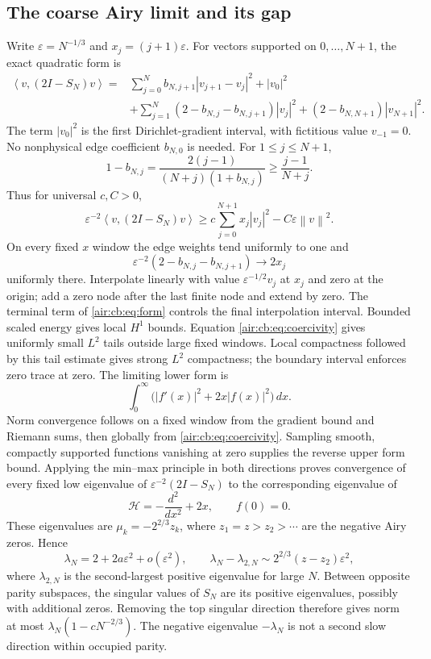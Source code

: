 \documentclass[11pt,letterpaper]{article}
\numberwithin{equation}{section}
\theoremstyle{remark}
\newcommand{\norm}[1]{\left\lVert#1\right\rVert}
\newcommand{\ip}[2]{\left\langle#1,#2\right\rangle}
\newcommand{\eps}{\varepsilon}
\begin{document}
\subsection{The coarse Airy limit and its gap}
Write $\eps=N^{-1/3}$ and $x_j=(j+1)\eps$. For vectors supported on
$0,\ldots,N+1$, the exact quadratic form is
\begin{equation}\label{air:cb:eq:form}
\begin{aligned}
\ip{v}{(2I-S_N)v}={}&\sum_{j=0}^{N}b_{N,j+1}|v_{j+1}-v_j|^2+|v_0|^2\\
&+\sum_{j=1}^{N}(2-b_{N,j}-b_{N,j+1})|v_j|^2
+(2-b_{N,N+1})|v_{N+1}|^2.
\end{aligned}
\end{equation}
The term $|v_0|^2$ is the first Dirichlet-gradient interval, with fictitious
value $v_{-1}=0$. No nonphysical edge coefficient $b_{N,0}$ is needed.
For $1\le j\le N+1$,
\[
1-b_{N,j}=\frac{2(j-1)}{(N+j)(1+b_{N,j})}\ge\frac{j-1}{N+j}.
\]
Thus for universal $c,C>0$,
\begin{equation}\label{air:cb:eq:coercivity}
\eps^{-2}\ip{v}{(2I-S_N)v}
\ge c\sum_{j=0}^{N+1}x_j|v_j|^2-C\eps\norm v^2.
\end{equation}
On every fixed $x$ window the edge weights tend uniformly to one and
\[
\eps^{-2}(2-b_{N,j}-b_{N,j+1})\longrightarrow2x_j
\]
uniformly there. Interpolate linearly with value $\eps^{-1/2}v_j$ at $x_j$
and zero at the origin; add a zero node after the last finite node and
extend by zero. The terminal term of \eqref{air:cb:eq:form} controls the final
interpolation interval. Bounded scaled energy gives local $H^1$ bounds.
Equation \eqref{air:cb:eq:coercivity} gives uniformly small $L^2$ tails outside
large fixed windows. Local compactness followed by this tail estimate gives
strong $L^2$ compactness; the boundary interval enforces zero trace at zero.
The limiting lower form is
\[
\int_0^\infty\bigl(|f'(x)|^2+2x|f(x)|^2\bigr)\,dx.
\]
Norm convergence follows on a fixed window from the gradient bound and
Riemann sums, then globally from \eqref{air:cb:eq:coercivity}. Sampling smooth,
compactly supported functions vanishing at zero supplies the reverse upper
form bound. Applying the min--max principle in both directions proves
convergence of every fixed low eigenvalue of $\eps^{-2}(2I-S_N)$ to the
corresponding eigenvalue of
\[
\mathcal H=-\frac{d^2}{dx^2}+2x,\qquad f(0)=0.
\]
These eigenvalues are $\mu_k=-2^{2/3}z_k$, where
$z_1=z>z_2>\cdots$ are the negative Airy zeros. Hence
\begin{equation}\label{air:cb:eq:airy-gap}
\lambda_N=2+2a\eps^2+o(\eps^2),\qquad
\lambda_N-\lambda_{2,N}\sim2^{2/3}(z-z_2)\eps^2,
\end{equation}
where $\lambda_{2,N}$ is the second-largest positive eigenvalue for large
$N$. Between opposite parity subspaces, the singular values of $S_N$ are
its positive eigenvalues, possibly with additional zeros. Removing the top
singular direction therefore gives norm at most
$\lambda_N(1-cN^{-2/3})$. The negative eigenvalue $-\lambda_N$ is not a
second slow direction within occupied parity.
\end{document}

